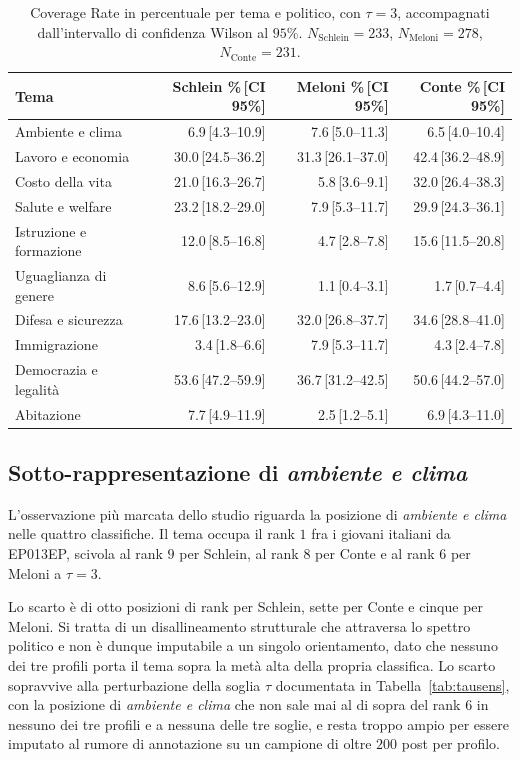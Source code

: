 \documentclass[11pt, a4paper]{article}
\begin{document}
\begin{table}[!htbp]
\centering
\caption{Coverage Rate in percentuale per tema e politico, con
$\tau=3$, accompagnati dall'intervallo di confidenza Wilson al $95\%$.
$N_{\text{Schlein}}=233$, $N_{\text{Meloni}}=278$,
$N_{\text{Conte}}=231$.}
\label{tab:fullcov}
\scriptsize
\begin{tabular}{l r r r}
\toprule
\textbf{Tema} & \textbf{Schlein \%\,[CI 95\%]} & \textbf{Meloni \%\,[CI 95\%]} & \textbf{Conte \%\,[CI 95\%]} \\
\midrule
Ambiente e clima        &  6.9\,[4.3--10.9]  &  7.6\,[5.0--11.3]  &  6.5\,[4.0--10.4] \\
Lavoro e economia       & 30.0\,[24.5--36.2] & 31.3\,[26.1--37.0] & 42.4\,[36.2--48.9] \\
Costo della vita        & 21.0\,[16.3--26.7] &  5.8\,[3.6--9.1]   & 32.0\,[26.4--38.3] \\
Salute e welfare        & 23.2\,[18.2--29.0] &  7.9\,[5.3--11.7]  & 29.9\,[24.3--36.1] \\
Istruzione e formazione & 12.0\,[8.5--16.8]  &  4.7\,[2.8--7.8]   & 15.6\,[11.5--20.8] \\
Uguaglianza di genere   &  8.6\,[5.6--12.9]  &  1.1\,[0.4--3.1]   &  1.7\,[0.7--4.4] \\
Difesa e sicurezza      & 17.6\,[13.2--23.0] & 32.0\,[26.8--37.7] & 34.6\,[28.8--41.0] \\
Immigrazione            &  3.4\,[1.8--6.6]   &  7.9\,[5.3--11.7]  &  4.3\,[2.4--7.8] \\
Democrazia e legalit\`a & 53.6\,[47.2--59.9] & 36.7\,[31.2--42.5] & 50.6\,[44.2--57.0] \\
Abitazione              &  7.7\,[4.9--11.9]  &  2.5\,[1.2--5.1]   &  6.9\,[4.3--11.0] \\
\bottomrule
\end{tabular}
\end{table}

\subsection{Sotto-rappresentazione di \emph{ambiente e clima}}

L'osservazione pi\`u marcata dello studio riguarda la posizione di
\emph{ambiente e clima} nelle quattro classifiche. Il tema occupa il
rank $1$ fra i giovani italiani da EP013EP, scivola al rank $9$ per
Schlein, al rank $8$ per Conte e al rank $6$ per Meloni a $\tau=3$.

Lo scarto \`e di otto posizioni di rank per Schlein, sette per Conte e
cinque per Meloni. Si tratta di un disallineamento strutturale che
attraversa lo spettro politico e non \`e dunque imputabile a un singolo
orientamento, dato che nessuno dei tre profili porta il tema sopra la
met\`a alta della propria classifica. Lo scarto sopravvive alla
perturbazione della soglia $\tau$ documentata in
Tabella~\ref{tab:tausens}, con la posizione di \emph{ambiente e
clima} che non sale mai al di sopra del rank $6$ in nessuno dei tre
profili e a nessuna delle tre soglie, e resta troppo ampio per
essere imputato al rumore di annotazione su un campione di oltre
$200$ post per profilo.
\end{document}
